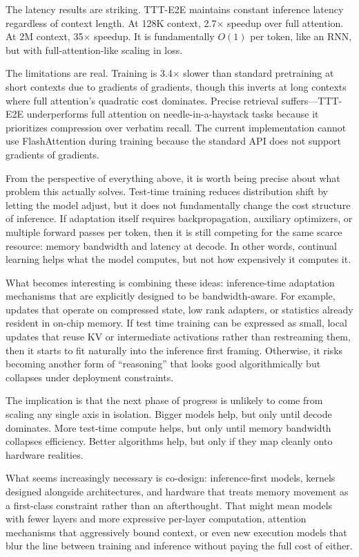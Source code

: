 \documentclass[12pt]{article}
\begin{document}
The latency results are striking. TTT-E2E maintains constant inference latency regardless of context length. At 128K context, 2.7$\times$ speedup over full attention. At 2M context, 35$\times$ speedup. It is fundamentally $O(1)$ per token, like an RNN, but with full-attention-like scaling in loss.

The limitations are real. Training is 3.4$\times$ slower than standard pretraining at short contexts due to gradients of gradients, though this inverts at long contexts where full attention's quadratic cost dominates. Precise retrieval suffers---TTT-E2E underperforms full attention on needle-in-a-haystack tasks because it prioritizes compression over verbatim recall. The current implementation cannot use FlashAttention during training because the standard API does not support gradients of gradients.

From the perspective of everything above, it is worth being precise about what problem this actually solves. Test-time training reduces distribution shift by letting the model adjust, but it does not fundamentally change the cost structure of inference. If adaptation itself requires backpropagation, auxiliary optimizers, or multiple forward passes per token, then it is still competing for the same scarce resource: memory bandwidth and latency at decode. In other words, continual learning helps what the model computes, but not how expensively it computes it.

What becomes interesting is combining these ideas: inference-time adaptation mechanisms that are explicitly designed to be bandwidth-aware. For example, updates that operate on compressed state, low rank adapters, or statistics already resident in on-chip memory. If test time training can be expressed as small, local updates that reuse KV or intermediate activations rather than restreaming them, then it starts to fit naturally into the inference first framing. Otherwise, it risks becoming another form of ``reasoning'' that looks good algorithmically but collapses under deployment constraints.

The implication is that the next phase of progress is unlikely to come from scaling any single axis in isolation. Bigger models help, but only until decode dominates. More test-time compute helps, but only until memory bandwidth collapses efficiency. Better algorithms help, but only if they map cleanly onto hardware realities.

What seems increasingly necessary is co-design: inference-first models, kernels designed alongside architectures, and hardware that treats memory movement as a first-class constraint rather than an afterthought. That might mean models with fewer layers and more expressive per-layer computation, attention mechanisms that aggressively bound context, or even new execution models that blur the line between training and inference without paying the full cost of either.
\end{document}
